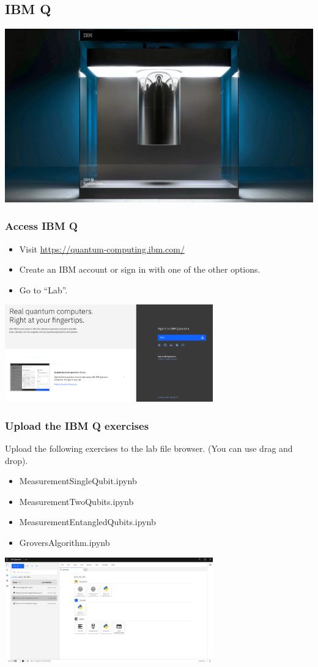 \documentclass[10pt]{beamer}
\begin{document}
\begin{frame}
  \section{IBM Q}
  \centering
  \includegraphics[width=0.7\linewidth]{img/IBMQ.jpg}
\end{frame}

\begin{frame}
  \frametitle{Access IBM Q}
  \begin{itemize}
  \item Visit \href{https://quantum-computing.ibm.com/}{https://quantum-computing.ibm.com/}
  \item Create an IBM account or sign in with one of the other options.
  \item Go to ``Lab''.
  \end{itemize}
  \centering
  \includegraphics[width=9cm]{img/ibmq-login.png}
\end{frame}

\begin{frame}
  \frametitle{Upload the IBM Q exercises}
  Upload the following exercises to the lab file browser. (You can use drag and drop).
  \begin{itemize}
  \item MeasurementSingleQubit.ipynb
  \item MeasurementTwoQubits.ipynb
  \item MeasurementEntangledQubits.ipynb
  \item GroversAlgorithm.ipynb
  \end{itemize}

  \centering
  \includegraphics[width=9cm]{img/ibmq-upload.png}
\end{frame}
\end{document}
